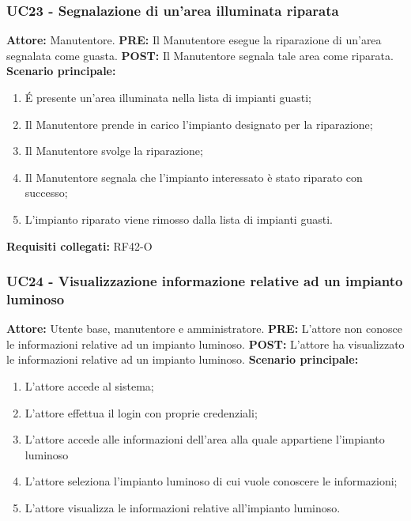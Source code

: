 \documentclass[a4paper, 12pt]{article}
\begin{document}
\subsubsection{UC23 - Segnalazione di un'area illuminata riparata}
\textbf{Attore:} Manutentore.\newline
\textbf{PRE:} Il Manutentore esegue la riparazione di un'area segnalata come guasta.\newline
\textbf{POST:} Il Manutentore segnala tale area come riparata. \newline
\textbf{Scenario principale:}
\begin{enumerate}
    \item \'E presente un'area illuminata nella lista di impianti guasti;
    \item Il Manutentore prende in carico l'impianto designato per la riparazione;
    \item Il Manutentore svolge la riparazione;
    \item Il Manutentore segnala che l'impianto interessato è stato riparato con successo;
    \item L'impianto riparato viene rimosso dalla lista di impianti guasti.
\end{enumerate}
\textbf{Requisiti collegati:} RF42-O\newline

\subsubsection{UC24 - Visualizzazione informazione relative ad un impianto luminoso}
\textbf{Attore: } Utente base, manutentore e amministratore.\newline
\textbf{PRE: } L'attore non conosce le informazioni relative ad un impianto luminoso.\newline
\textbf{POST: } L'attore ha visualizzato le informazioni relative ad un impianto luminoso.\newline
\textbf{Scenario principale: }
\begin{enumerate}
    \item L'attore accede al sistema;
    \item L'attore effettua il login con proprie credenziali;
    \item L'attore accede alle informazioni dell'area alla quale appartiene l'impianto luminoso
    \item L'attore seleziona l'impianto luminoso di cui vuole conoscere le informazioni;
    \item L'attore visualizza le informazioni relative all'impianto luminoso.
\end{enumerate}
\end{document}
